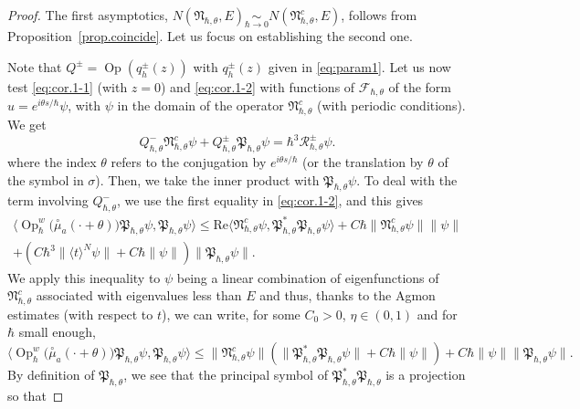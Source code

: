 \documentclass[10pt]{amsart}
\DeclareMathOperator{\Op}{Op}
\theoremstyle{plain}
\theoremstyle{definition}
\renewcommand{\Re}{\mathrm{Re}}
\begin{document}
\begin{proof}
The first asymptotics, $N(\mathfrak{N}_{\hbar,\theta},E)\underset{\hbar\to 0}\sim N(\mathfrak{N}^c_{\hbar,\theta},E)$, follows from Proposition~\ref{prop.coincide}.
Let us focus on establishing the second one.


Note that $Q^\pm=\Op(q_{h}^\pm(z))$ with $q_h^{\pm}(z)$ given in \eqref{eq:param1}. Let us now test \eqref{eq:cor.1-1} (with $z=0$) and \eqref{eq:cor.1-2} with functions of $\mathscr{F}_{\hbar, \theta}$ of the form $u=e^{i\theta s/\hbar}\psi$, with $\psi$ in the domain of the operator $\mathfrak{N}_{\hbar,\theta}^c$ (with periodic conditions). We get
\begin{equation}\label{eq.Qpm}
Q^-_{\hbar,\theta}\mathfrak{N}_{\hbar,\theta}^c\psi+Q^\pm_{\hbar,\theta}\mathfrak{P}_{\hbar,\theta}\psi=\hbar^3\mathscr R_{\hbar,\theta}^\pm\psi.
\end{equation}
where the index $\theta$ refers to the conjugation by $e^{i\theta s/\hbar}$ (or the translation by $\theta$ of the symbol in $\sigma$). Then, we take the inner product with $\mathfrak{P}_{\hbar,\theta}\psi$. To deal with the term involving $Q^-_{\hbar,\theta}$, we use the first equality in \eqref{eq:cor.1-2}, and this gives
\begin{multline}\label{eq.ubqpm}
\langle\Op^w_\hbar\bigl(\overset{\circ}{\mu}_a(\cdot+\theta)\bigr)\mathfrak{P}_{\hbar,\theta}\psi,\mathfrak{P}_{\hbar,\theta}\psi\rangle\leq\Re \langle \mathfrak{N}^c_{\hbar,\theta}\psi,\mathfrak{P}^*_{\hbar,\theta}\mathfrak{P}_{\hbar,\theta}\psi\rangle
+C\hbar\|\mathfrak{N}^c_{\hbar,\theta}\psi\|\|\psi\|\\
+(C\hbar^3\|\langle t\rangle ^N\psi\|+C\hbar\|\psi\|)\|\mathfrak{P}_{\hbar,\theta}\psi\|.
\end{multline}
We apply this inequality to $\psi$ being a linear combination of eigenfunctions of $\mathfrak N_{\hbar,\theta}^c$ associated with eigenvalues less than $E$ and thus, thanks to the Agmon estimates (with respect to $t$), we can write, for some $C_0>0$, $\eta\in(0,1)$ and for $\hbar$ small enough,
\[
\langle\Op^w_\hbar\bigl(\overset{\circ}{\mu}_a(\cdot+\theta)\bigr)\mathfrak{P}_{\hbar,\theta}\psi,\mathfrak{P}_{\hbar,\theta}\psi\rangle\leq \|\mathfrak{N}^c_{\hbar,\theta}\psi\|(\|\mathfrak{P}^*_{\hbar,\theta}\mathfrak{P}_{\hbar,\theta}\psi\|+C\hbar\|\psi\|) +C\hbar\|\psi\|\|\mathfrak{P}_{\hbar,\theta}\psi\|.
\]
By definition of $\mathfrak{P}_{\hbar,\theta}$, we see that the principal symbol of $\mathfrak{P}^*_{\hbar,\theta}\mathfrak{P}_{\hbar,\theta}$ is a projection so that

\end{proof}
\end{document}
